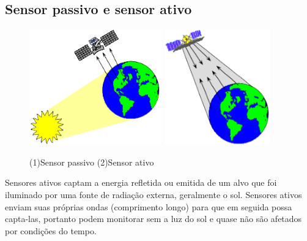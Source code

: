 \documentclass[12pt, a4paper]{article}
\begin{document}
    \subsection{Sensor passivo e sensor ativo}
    	\vspace{2mm}
    	\begin{figure}[!htb]
			\begin{center}
				\includegraphics[height=5cm]{Screenshot_5} \quad
				\includegraphics[height=5cm]{Screenshot_6}
			\caption{(1)Sensor passivo (2)Sensor ativo} 	\label{gdimotes}
			\end{center}
		\end{figure}
    
    Sensores ativos captam a energia refletida ou emitida de um alvo que foi iluminado por uma fonte de radiação externa, geralmente o sol. Sensores ativos enviam suas próprias ondas (comprimento longo) para que em seguida possa capta-las, portanto podem monitorar sem a luz do sol e quase não são afetados por condições do tempo.
    \vspace{4mm}
\end{document}
